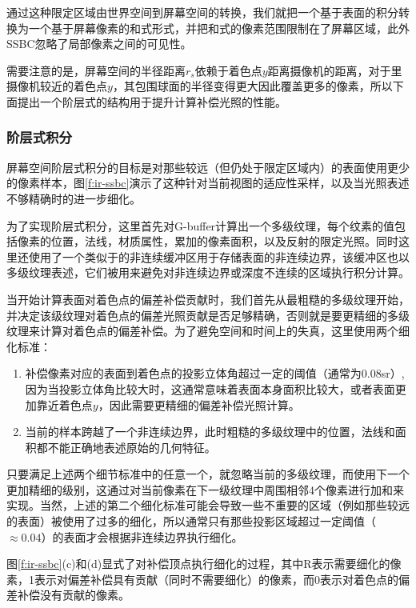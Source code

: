 通过这种限定区域由世界空间到屏幕空间的转换，我们就把一个基于表面的积分转换为一个基于屏幕像素的和式形式，并把和式的像素范围限制在了屏幕区域，此外SSBC忽略了局部像素之间的可见性。

需要注意的是，屏幕空间的半径距离$r_s$依赖于着色点$y$距离摄像机的距离，对于里摄像机较近的着色点$y$，其包围球面的半径变得更大因此覆盖更多的像素，所以下面提出一个阶层式的结构用于提升计算补偿光照的性能。 



\subsubsection{阶层式积分}
屏幕空间阶层式积分的目标是对那些较远（但仍处于限定区域内）的表面使用更少的像素样本，图\ref{f:ir-ssbc}演示了这种针对当前视图的适应性采样，以及当光照表述不够精确时的进一步细化。

为了实现阶层式积分，这里首先对G-buffer计算出一个多级纹理，每个纹素的值包括像素的位置，法线，材质属性，累加的像素面积，以及反射的限定光照。同时这里还使用了一个类似于\cite{a:Hierarchicalimage-spaceradiosityforinteractiveglobalillumination}的非连续缓冲区用于存储表面的非连续边界，该缓冲区也以多级纹理表述，它们被用来避免对非连续边界或深度不连续的区域执行积分计算。

当开始计算表面对着色点的偏差补偿贡献时，我们首先从最粗糙的多级纹理开始，并决定该级纹理对着色点的偏差光照贡献是否足够精确，否则就是要更精细的多级纹理来计算对着色点的偏差补偿。为了避免空间和时间上的失真，这里使用两个细化标准：

\begin{enumerate}
	\item 补偿像素对应的表面到着色点的投影立体角超过一定的阈值（通常为0.08sr）,因为当投影立体角比较大时，这通常意味着表面本身面积比较大，或者表面更加靠近着色点$y$，因此需要更精细的偏差补偿光照计算。
	\item 当前的样本跨越了一个非连续边界，此时粗糙的多级纹理中的位置，法线和面积都不能正确地表述原始的几何特征。
\end{enumerate}

只要满足上述两个细节标准中的任意一个，就忽略当前的多级纹理，而使用下一个更加精细的级别，这通过对当前像素在下一级纹理中周围相邻4个像素进行加和来实现。当然，上述的第二个细化标准可能会导致一些不重要的区域（例如那些较远的表面）被使用了过多的细化，所以通常只有那些投影区域超过一定阈值（$\approx 0.04$）的表面才会根据非连续边界执行细化。

图\ref{f:ir-ssbc}(c)和(d)显式了对补偿顶点执行细化的过程，其中R表示需要细化的像素，1表示对偏差补偿具有贡献（同时不需要细化）的像素，而0表示对着色点的偏差补偿没有贡献的像素。
 
